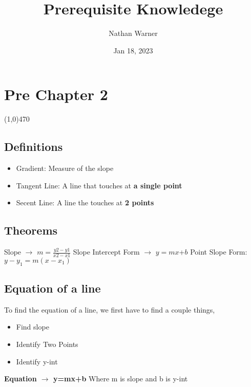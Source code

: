 \documentclass{report}
\title{\Huge{Prerequisite Knowledege}}
\author{\huge{Nathan Warner}}
\date{\huge{Jan 18, 2023}}
\begin{document}
    \maketitle
    \section{\Large{Pre Chapter 2}}
    \line(1,0){470}

    \bigbreak \noindent 
    \subsection{\large{Definitions}}
    \begin{large}
        \begin{itemize}
            \item Gradient: Measure of the slope 
            \item Tangent Line: A line that touches at \textbf{a single point}
            \item Secent Line: A line the touches at \textbf{2 points}
        \end{itemize}
    \end{large}

    \bigbreak \noindent 
    \subsection{\large{Theorems}}
    \begin{large}
        Slope $\rightarrow$ $m=\frac{y2-y1}{x2-x1}$ 
        \bigbreak \noindent 
        Slope Intercept Form $\rightarrow$ $y=mx$+$b$
        \bigbreak \noindent 
        Point Slope Form: $y-y_1 = m\left(x-x_1\right)$
    \end{large}
    

    \bigbreak \noindent 
    \subsection{\large{Equation of a line}}
    \begin{large}
       To find the equation of a line, we first have to find a couple things,
       \begin{itemize}
            \item Find slope
            \item Identify Two Points
            \item Identify y-int
       \end{itemize}

       \begin{center}
           \textbf{Equation $\rightarrow$ y=mx+b}       
           \bigbreak \noindent 
           Where m is slope and b is y-int
       \end{center}
    \end{large}
    
    
\end{document}
